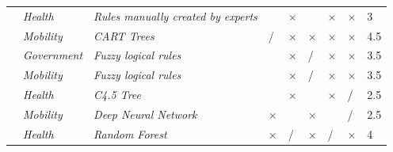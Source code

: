 \begin{table}
{\begin{tabular}{M{3.5cm}M{2.2cm}M{4cm}M{.5cm}M{.5cm}M{.5cm}M{.5cm}M{.5cm}M{1.5cm}}
\cite{Martinruizetal}  & \textit{Health}                   & \textit{Rules manually created by experts}                           &                      &$\times$                         &                                 &$\times$                                 &$\times$                        & 3                      \\ 
\cite{olszewskiturek} & \textit{Mobility}                 & \textit{CART Trees} \citep{carttrees}                                                   & /                    &$\times$                         &$\times$                               &$\times$                                 &$\times$                        & 4.5                    \\
\cite{Olzewskietal}    & \textit{Government}               & \textit{Fuzzy logical rules} \citep{fuzzyenvironment}                                         &                      &$\times$                         & /                               &$\times$                                 &$\times$                        & 3.5                    \\ 
\cite{orlowskietal}     & \textit{Mobility}                 & \textit{Fuzzy logical rules}                                         &                      &$\times$                         & /                               &$\times$                                 &$\times$                        & 3.5                    \\ 
\cite{peraletal}        & \textit{Health}                   & \textit{C4.5 Tree} \citep{c45tree}                                                   &                      &$\times$                         &                                 &$\times$                                 & /                        & 2.5                    \\ 
\cite{persaudetal}      & \textit{Mobility}                 & \textit{Deep Neural Network}                                         &$\times$                    &                           &$\times$                               &                                   & /                        & 2.5                    \\ 
\cite{ribonietal}       & \textit{Health}                   & \textit{Random Forest} \citep{randomforest}                                               &$\times$                    & /                         &$\times$                               & /                                 &$\times$                        & 4                      \\ 

\end{tabular}}
\end{table}
